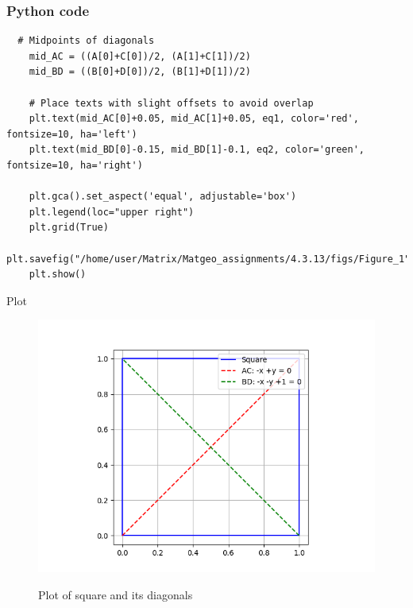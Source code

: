 \documentclass{beamer}
\begin{document}
\begin{frame}[fragile]
    \frametitle{Python code}

    \begin{lstlisting}
  # Midpoints of diagonals
    mid_AC = ((A[0]+C[0])/2, (A[1]+C[1])/2)
    mid_BD = ((B[0]+D[0])/2, (B[1]+D[1])/2)
    
    # Place texts with slight offsets to avoid overlap
    plt.text(mid_AC[0]+0.05, mid_AC[1]+0.05, eq1, color='red', fontsize=10, ha='left')
    plt.text(mid_BD[0]-0.15, mid_BD[1]-0.1, eq2, color='green', fontsize=10, ha='right')
    
    plt.gca().set_aspect('equal', adjustable='box')
    plt.legend(loc="upper right")
    plt.grid(True)
    plt.savefig("/home/user/Matrix/Matgeo_assignments/4.3.13/figs/Figure_1")
    plt.show()
    \end{lstlisting}
\end{frame}

\begin{frame}{Plot}
    \begin{figure}[H]
    \centering
    \caption{Plot of square and its diagonals}
    \includegraphics[width=0.6\columnwidth]{figs/Figure_1.png}
    \label{fig:1}
    \end{figure}
\end{frame}
\end{document}
